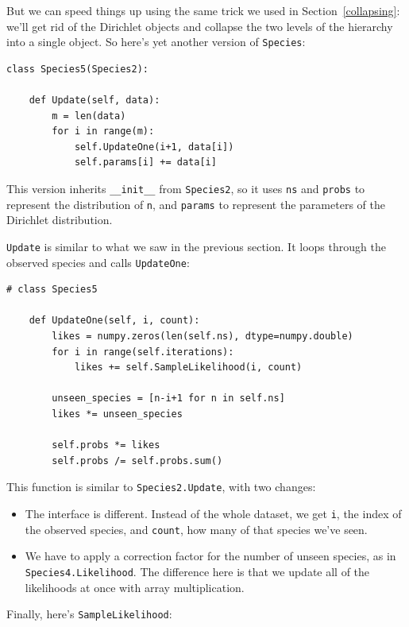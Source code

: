 \documentclass[12pt]{book}
\begin{document}
But we can speed things up using the same trick we used in
Section~\ref{collapsing}: we'll get rid of the Dirichlet objects and
collapse the two levels of the hierarchy into a single object.  So
here's yet another version of {\tt Species}:

\begin{verbatim}
class Species5(Species2):
    
    def Update(self, data):
        m = len(data)
        for i in range(m):
            self.UpdateOne(i+1, data[i])
            self.params[i] += data[i]
\end{verbatim}

This version inherits \verb"__init__" from {\tt Species2}, so
it uses {\tt ns} and {\tt probs} to represent the distribution
of {\tt n}, and {\tt params} to represent the parameters of
the Dirichlet distribution.

{\tt Update} is similar to what we saw in the previous section.
It loops through the observed species and calls {\tt UpdateOne}:

\begin{verbatim}
# class Species5

    def UpdateOne(self, i, count):
        likes = numpy.zeros(len(self.ns), dtype=numpy.double)
        for i in range(self.iterations):
            likes += self.SampleLikelihood(i, count)

        unseen_species = [n-i+1 for n in self.ns]
        likes *= unseen_species

        self.probs *= likes
        self.probs /= self.probs.sum()
\end{verbatim}

This function is similar to {\tt Species2.Update}, with two changes:

\begin{itemize}

\item The interface is different.  Instead of the whole dataset, we
  get {\tt i}, the index of the observed species, and {\tt count},
  how many of that species we've seen.

\item We have to apply a correction factor for the number of unseen
  species, as in {\tt Species4.Likelihood}.  The difference here is
  that we update all of the likelihoods at once with array
  multiplication.

\end{itemize}

Finally, here's {\tt SampleLikelihood}:
\end{document}
